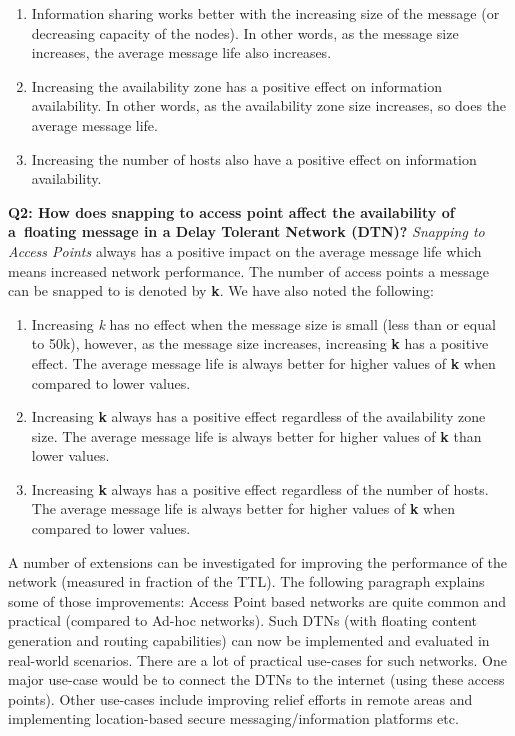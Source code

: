 \begin{enumerate}
  \item Information sharing works better with the increasing size of the message (or decreasing capacity of the nodes). In other words, as the message size increases, the average message life also increases.
  \item Increasing the availability zone has a positive effect on information availability. In other words, as the availability zone size increases, so does the average message life.
  \item Increasing the number of hosts also have a positive effect on information availability.
\end{enumerate}
\vspace{4mm}
\textbf{Q2: How does snapping to access point affect the availability of a floating message in a Delay Tolerant Network (DTN)?}\newline
\textit{Snapping to Access Points} always has a positive impact on the average message life which means increased network performance. The number of access points a message can be snapped to is denoted by \textbf{k}. We have also noted the following:
\begin{enumerate}
  \item Increasing \textit{k} has no effect when the message size is small (less than or equal to 50k), however, as the message size increases, increasing \textbf{k} has a positive effect. The average message life is always better for higher values of \textbf{k} when compared to lower values.
  \item Increasing \textbf{k} always has a positive effect regardless of the availability zone size. The average message life is always better for higher values of \textbf{k} than lower values.
  \item Increasing \textbf{k} always has a positive effect regardless of the number of hosts. The average message life is always better for higher values of \textbf{k} when compared to lower values.
\end{enumerate}
A number of extensions can be investigated for improving the performance of the network (measured in fraction of the TTL). The following paragraph explains some of those improvements:\newline
Access Point based networks are quite common and practical (compared to Ad-hoc networks). Such DTNs (with floating content generation and routing capabilities) can now be implemented and evaluated in real-world scenarios. There are a lot of practical use-cases for such networks. One major use-case would be to connect the DTNs to the internet (using these access points). Other use-cases include improving relief efforts in remote areas and implementing location-based secure messaging/information platforms etc. \newline

